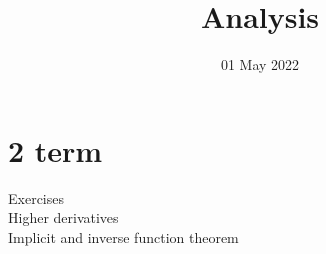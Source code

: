 
\title{Analysis}
\author{}
\date{01 May 2022}

\maketitle
\section{2 term}
\begin{description}
    \item[Exercises] 
    \item[Higher derivatives] 
    \item[Implicit and inverse function theorem] 
\end{description}
